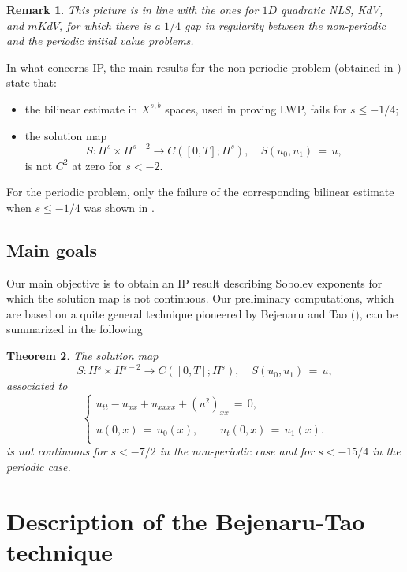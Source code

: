 \documentclass{amsart}
\newtheorem{theorem}{Theorem}[section]
\newtheorem{remark}[theorem]{Remark}
\begin{document}
\begin{remark}
This picture is in line with the ones for $1D$ quadratic NLS, KdV, and $mKdV$, for which there is a $1/4$ gap in regularity between the non-periodic and the periodic initial value problems. 
\end{remark}

In what concerns IP, the main results for the non-periodic problem (obtained in \cite{F09}) state that:
\begin{itemize}
\item the bilinear estimate in $X^{s,b}$ spaces, used in proving LWP, fails for $s\leq -1/4$;

\item the solution map 
\[
S: H^s\times H^{s-2} \to C([0,T]; H^s), \quad
S(u_0,u_1)\,=\,u,
\]
is not $C^2$ at zero for $s<-2$.
\end{itemize}

For the periodic problem, only the failure of the corresponding bilinear estimate when $s\leq -1/4$ was shown in \cite{FS10}.

\subsection{Main goals} Our main objective is to obtain an IP result describing Sobolev exponents for which the solution map is not continuous. Our preliminary computations, which are based on a quite general technique pioneered by Bejenaru and Tao (\cite{BT06}), can be summarized in the following

\begin{theorem}
The solution map 
\[
S: H^s\times H^{s-2} \to C([0,T]; H^s), \quad
S(u_0,u_1)\,=\,u,
\]
associated to 
\begin{equation}
\left\{
\begin{array}{l}
u_{tt}-u_{xx}+u_{xxxx}+(u^2)_{xx}\,=\,0,\\
\\
u(0,x)\,=\,u_0(x),\qquad u_t(0,x)\,=\,u_1(x).\\
\end{array}\right.
\label{chs}
\end{equation}
is not continuous for $s<-7/2$ in the non-periodic case and for $s<-15/4$ in the periodic case.
\label{mth}
\end{theorem}

\section{Description of the Bejenaru-Tao technique}
\end{document}
